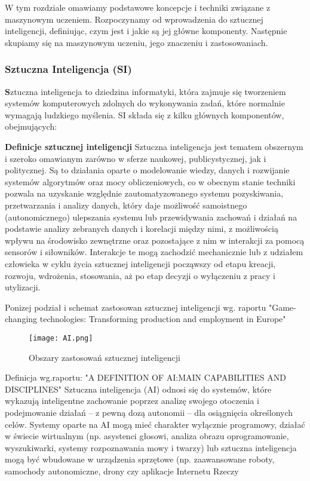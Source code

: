 W tym rozdziale omawiamy podstawowe koncepcje i techniki związane z maszynowym uczeniem. Rozpoczynamy od wprowadzenia do sztucznej inteligencji, definiując, czym jest i jakie są jej główne komponenty. Następnie skupiamy się na maszynowym uczeniu, jego znaczeniu i zastosowaniach.


\vspace{\baselineskip}
\subsubsection{Sztuczna Inteligencja (SI)}
\textbf
Sztuczna inteligencja to dziedzina informatyki, która zajmuje się tworzeniem systemów komputerowych zdolnych do wykonywania zadań, które normalnie wymagają ludzkiego myślenia. SI składa się z kilku głównych komponentów, obejmujących:

\textbf {Definicje sztucznej inteligencji}
Sztuczna inteligencja jest tematem obszernym i szeroko omawianym zarówno w sferze naukowej, publicystycznej, jak i politycznej. Są to działania oparte o modelowanie wiedzy, danych i rozwijanie systemów algorytmów oraz mocy obliczeniowych, co w obecnym stanie techniki pozwala na uzyskanie względnie zautomatyzowanego systemu pozyskiwania, przetwarzania i analizy danych, który daje możliwość samoistnego (autonomicznego) ulepszania systemu lub przewidywania zachowań i działań na podstawie analizy zebranych danych i korelacji między nimi, z możliwością wpływu na środowisko zewnętrzne oraz pozostające z nim w interakcji za pomocą sensorów i siłowników. Interakcje te mogą zachodzić mechanicznie lub z udziałem człowieka w cyklu życia sztucznej inteligencji począwszy od etapu kreacji, rozwoju, wdrożenia, stosowania, aż po etap decyzji o wyłączeniu z pracy i utylizacji.\cite{gov2023}


Ponizej podział i schemat zastosowan sztucznej inteligencji wg. raportu "Game-changing technologies: Transforming production and employment in Europe"
\begin{figure}[!h]
    \label{fig:ai}
    \centering \texttt{[image: AI.png]}
    \caption{Obszary zastosowań  sztucznej inteligencji\cite{gov2023}}
\end{figure}

Definicja wg.raportu: "A DEFINITION OF AI:MAIN CAPABILITIES AND DISCIPLINES"  
Sztuczna inteligencja (AI) odnosi się do systemów, które wykazują inteligentne zachowanie poprzez analizę swojego otoczenia i
podejmowanie działań – z pewną dozą autonomii – dla osiągnięcia określonych celów.
Systemy oparte na AI mogą mieć charakter wyłącznie programowy, działać w świecie wirtualnym (np. asystenci głosowi, analiza obrazu
oprogramowanie, wyszukiwarki, systemy rozpoznawania mowy i twarzy) lub sztuczna inteligencja mogą być wbudowane w urządzenia sprzętowe (np.
zaawansowane roboty, samochody autonomiczne, drony czy aplikacje Internetu Rzeczy\cite{ec2029}



